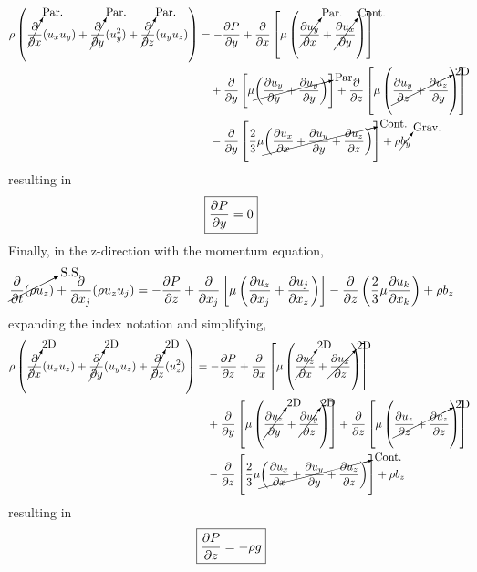 \begin{align*}
    \rho \left(\cancelto{\text{Par.}}{\frac{\partial}{\partial x}} (u_x u_y) + \cancelto{\text{Par.}}{\frac{\partial}{\partial y}} (u_y^2) + \cancelto{\text{Par.}}{\frac{\partial}{\partial z}} (u_y u_z) \right) &=  -\frac{\partial P}{\partial y} + \frac{\partial}{\partial x} \left[\mu \left(\cancelto{\text{Par.}}{\frac{\partial u_y}{\partial x}} + \cancelto{\text{Cont.}}{\frac{\partial u_x}{\partial y}} \right) \right] \\
    &\quad + \frac{\partial}{\partial y} \left[\mu \cancelto{\text{Par.}}{\left(\frac{\partial u_y}{\partial y} + \frac{\partial u_y}{\partial y} \right)} \right] + \frac{\partial}{\partial z} \left[\mu \left(\cancelto{\text{2D}}{\frac{\partial u_y}{\partial z} + \frac{\partial u_z}{\partial y}} \right) \right] \\
    &\quad - \frac{\partial}{\partial y} \left[\frac{2}{3} \mu \cancelto{\text{Cont.}}{\left(\frac{\partial u_x}{\partial x} + \frac{\partial u_y}{\partial y} + \frac{\partial u_z}{\partial z} \right)} \right] + \rho \cancelto{\text{Grav.}}{b_y}
\end{align*}
resulting in
\begin{align*}
    \Aboxed{\frac{\partial P}{\partial y} &= 0}
\end{align*}
Finally, in the z-direction with the momentum equation,
\begin{align*}
    \cancelto{\text{S.S.}}{\frac{\partial}{\partial t} (\rho u_z)} + \frac{\partial}{\partial x_j} (\rho u_z u_j) &= -\frac{\partial P}{\partial z}+ \frac{\partial}{\partial x_j} \left[\mu \left( \frac{\partial u_z}{\partial x_j} + \frac{\partial u_j}{\partial x_z} \right) \right] - \frac{\partial}{\partial z} \left(\frac{2}{3} \mu \frac{\partial u_k}{\partial x_k} \right) + \rho b_z
\end{align*}
expanding the index notation and simplifying,
\begin{align*}
    \rho \left(\cancelto{\text{2D}}{\frac{\partial}{\partial x}} (u_x u_z) + \cancelto{\text{2D}}{\frac{\partial}{\partial y}} (u_y u_z) + \cancelto{\text{2D}}{\frac{\partial}{\partial z}} (u_z^2) \right) &=  -\frac{\partial P}{\partial z} + \frac{\partial}{\partial x} \left[\mu \left(\cancelto{\text{2D}}{\frac{\partial u_z}{\partial x}} + \cancelto{\text{2D}}{\frac{\partial u_x}{\partial z}} \right) \right] \\
    &\quad + \frac{\partial}{\partial y} \left[\mu \left(\cancelto{\text{2D}}{\frac{\partial u_z}{\partial y}} + \cancelto{\text{2D}}{\frac{\partial u_y}{\partial z}} \right) \right] + \frac{\partial}{\partial z} \left[\mu \left(\cancelto{\text{2D}}{\frac{\partial u_z}{\partial z} + \frac{\partial u_z}{\partial z}} \right) \right] \\
    &\quad - \frac{\partial}{\partial z} \left[\frac{2}{3} \mu \cancelto{\text{Cont.}}{\left(\frac{\partial u_x}{\partial x} + \frac{\partial u_y}{\partial y} + \frac{\partial u_z}{\partial z} \right)} \right] + \rho b_z
\end{align*}
resulting in
\begin{align*}
    \Aboxed{\frac{\partial P}{\partial z} &= -\rho g}
\end{align*}